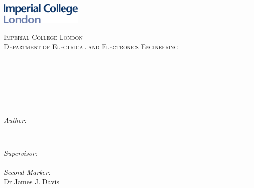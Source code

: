 \begin{titlepage}

    \newcommand{\HRule}{\rule{\linewidth}{0.5mm}} %
    
    
    
    \includegraphics[width = 4cm]{./images/title/imperial}\\[0.5cm] 
    
    \center %
    
    
    \textsc{\Large Imperial College London}\\[0.5cm] 
    \textsc{\large Department of Electrical and Electronics Engineering}\\[0.5cm] 
    
    
    \HRule \\[0cm]
    { \huge \bfseries \reporttitle \\} %
    \HRule \\[0.5cm]
     
    
    \begin{minipage}{0.4\textwidth}
    \begin{flushleft} \large
    \emph{Author:}\\
    \reportauthor %
    \end{flushleft}
    \end{minipage}
    ~
    \begin{minipage}{0.4\textwidth}
    \begin{flushright} \large
    \emph{Supervisor:} \\
    \supervisor \\[1.2em] %
    \emph{Second Marker:} \\
    Dr James J. Davis %
    \end{flushright}
    \end{minipage}\\[4cm]
    

\end{titlepage}
